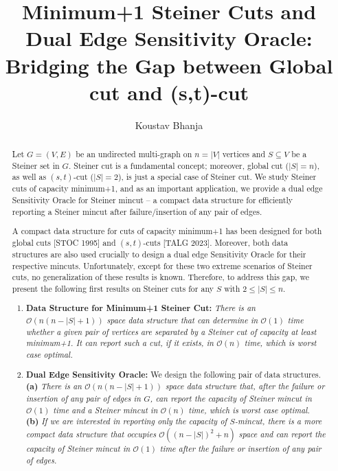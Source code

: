 \documentclass[letterpaper,11pt]{article}
\title{Minimum+1 Steiner Cuts and Dual Edge Sensitivity Oracle: Bridging the Gap between Global cut and (s,t)-cut}
\author[1]{Koustav Bhanja}
\affil[1]{Indian Institute of Technology Kanpur, India}
\affil[ ]{\texttt{kbhanja@cse.iitk.ac.in}}
\date{}
\begin{document}
\begin{titlepage}


\maketitle

\begin{abstract}
Let $G=(V,E)$ be an undirected multi-graph on $n=|V|$ vertices and $S\subseteq V$ be a Steiner set in $G$. 
Steiner cut is a fundamental concept; moreover, global cut ($|S|=n$), as well as $(s,t)$-cut ($|S|=2$), is just a special case of Steiner cut. 
We study Steiner cuts of capacity minimum+1, and as an important application, we provide a dual edge Sensitivity Oracle for Steiner mincut -- a compact data structure for efficiently reporting a Steiner mincut after failure/insertion of any pair of edges.

A compact data structure for cuts of capacity minimum+1 has been designed for both global cuts [STOC 1995] and $(s,t)$-cuts [TALG 2023]. Moreover, both data structures are also used crucially to design a dual edge Sensitivity Oracle for their respective mincuts. 
Unfortunately, except for these two extreme scenarios of Steiner cuts, no generalization of these results is known. Therefore, to address this gap, we present the following first results on Steiner cuts for any $S$ with $2\le |S|\le n$.

\begin{enumerate}
    \item \textbf{Data Structure for Minimum+1 Steiner Cut:} \textit{There is an ${\mathcal O}(n(n-|S|+1))$ space data structure that can determine in ${\mathcal O}(1)$ time whether a given pair of vertices are separated by a Steiner cut of capacity at least minimum+1. 
    It can report such a cut, if it exists, in ${\mathcal O}(n)$ time, which is worst case optimal.}
    
    \item \textbf{Dual Edge Sensitivity Oracle:} We design the following pair of data structures.\\  
     \textbf{(a)} \textit{There is an ${\mathcal O}(n(n-|S|+1))$ space data structure that, after the failure or insertion of any pair of edges in $G$, can report the capacity of Steiner mincut in ${\mathcal O}(1)$ time and a Steiner mincut in ${\mathcal O}(n)$ time, which is worst case optimal.}\\
    \textbf{(b)} \textit{ If we are interested in reporting only the capacity of $S$-mincut, there is a more compact data structure that occupies ${\mathcal O}((n-|S|)^2+n)$ space and can report the capacity of Steiner mincut in ${\mathcal O}(1)$ time after the failure or insertion of any pair of edges.} 
  


\end{enumerate}
\end{abstract}
\end{titlepage}
\end{document}

